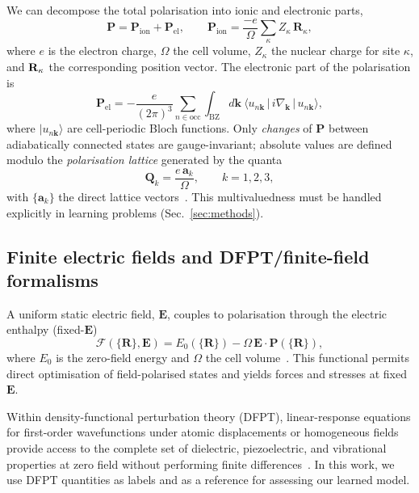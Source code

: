 \documentclass[aps,physrev,graphicx,amsmath,amssymb,
               reprint,superscriptaddress]{revtex4-2}
\begin{document}
We can decompose the total polarisation into ionic and electronic parts,
\begin{equation}
\mathbf P = \mathbf P_\text{ion}+\mathbf P_\text{el},
\qquad
\mathbf P_\text{ion} = \frac{-e}{\Omega}\sum_{\kappa} Z_\kappa\,\mathbf R_\kappa,
\label{eq:P_total}
\end{equation}
where $e$ is the electron charge, $\Omega$ the cell volume, $Z_{\kappa}$ the nuclear charge for site $\kappa$, and $\vb{R}_{\kappa}$ the corresponding position vector. The electronic part of the polarisation is
\begin{equation}
\mathbf P_\text{el}
= -\frac{e}{(2\pi)^3}\sum_{n\in\text{occ}}
\int_{\text{BZ}} \! d\mathbf k\
\langle u_{n\mathbf k}\,|\, i\nabla_{\mathbf k}\,|\,u_{n\mathbf k}\rangle,
\label{eq:P_berry}
\end{equation}
where $|u_{n\mathbf k}\rangle$ are cell-periodic Bloch functions. Only \emph{changes} of $\mathbf P$ between adiabatically connected states are gauge-invariant; absolute values are defined modulo the \emph{polarisation lattice} generated by the quanta
\begin{equation}
\mathbf Q_k=\frac{e\,\mathbf a_k}{\Omega},\qquad k=1,2,3,
\label{eq:pol_quanta}
\end{equation}
with $\{\mathbf a_k\}$ the direct lattice vectors~\cite{king-smith-vanderbilt-1993,resta-1994}. This multivaluedness must be handled explicitly in learning problems (Sec.~\ref{sec:methods}).

\subsection{Finite electric fields and DFPT/finite-field formalisms}
A uniform static electric field, $\mathbf E$, couples to polarisation through the electric enthalpy (fixed-$\mathbf E$)
\begin{equation}
\mathcal F(\{\mathbf R\},\mathbf E) = E_0(\{\mathbf R\}) - \Omega\,\mathbf E\!\cdot\!\mathbf P(\{\mathbf R\}),
\label{eq:enthalpy}
\end{equation}
where $E_0$ is the zero-field energy and $\Omega$ the cell volume~\cite{nunes-gonze-2001,souza-iniguez-vanderbilt-2002}. This functional permits direct optimisation of field-polarised states and yields forces and stresses at fixed~$\mathbf E$.

Within density-functional perturbation theory (DFPT), linear-response equations for first-order wavefunctions under atomic displacements or homogeneous fields provide access to the complete set of dielectric, piezoelectric, and vibrational properties at zero field without performing finite differences~\cite{gonze_dynamical_1997}. In this work, we use DFPT quantities as labels and as a reference for assessing our learned model.
\end{document}
